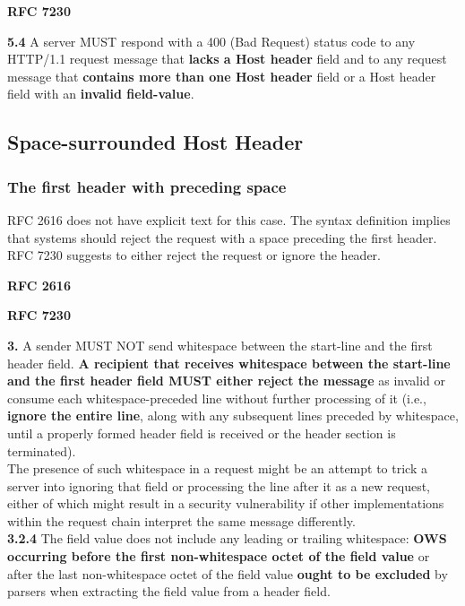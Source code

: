 \textbf{RFC 7230}
\columnseprule=1pt    %
\begin{multicols}{2}
	\begin{spacing}{0.8}
	\textbf{5.4}
	{\footnotesize A server MUST respond with a 400 (Bad Request) status code to any HTTP/1.1 request message that \textbf{lacks a Host header} field and to any request message that \textbf{contains more than one Host header} field or a Host header field with an \textbf{invalid field-value}.}
	\end{spacing}
\end{multicols}

\subsection{Space-surrounded Host Header}
\subsubsection{The first header with preceding space}
RFC 2616 does not have explicit text for this case. The syntax definition implies that systems should reject the request with a space preceding the first header. RFC 7230 suggests to either reject the request or ignore the header.

\textbf{RFC 2616}
\columnseprule=1pt    %
\begin{multicols}{2}
	\begin{spacing}{0.8}
		\textbf{} 
		{\footnotesize  }
	\end{spacing}
\end{multicols}

\textbf{RFC 7230}
\columnseprule=1pt    %
\begin{multicols}{2}
	\begin{spacing}{0.8}
		\textbf{3.} 
		{\footnotesize 
		A sender MUST NOT send whitespace between the start-line and the
		first header field. \textbf{A recipient that receives whitespace between the start-line and the first header field MUST either reject the message} as invalid or consume each whitespace-preceded line without further processing of it (i.e., \textbf{ignore the entire line}, along with any subsequent lines preceded by whitespace, until a properly formed header field is received or the header section is terminated).\vspace{1ex} \\ 
		The presence of such whitespace in a request might be an attempt to trick a server into ignoring that field or processing the line after it as a new request, either of which might result in a security vulnerability if other implementations within the request chain interpret the same message differently.\\	
		}
		\textbf{3.2.4} 
	    {\footnotesize  The field value does not include any leading or trailing whitespace: \textbf{OWS occurring before the first non-whitespace octet of the field value} or after the last non-whitespace octet of the field value \textbf{ought to be excluded} by parsers when extracting the field value from a header field.}
	\end{spacing}
\end{multicols}

